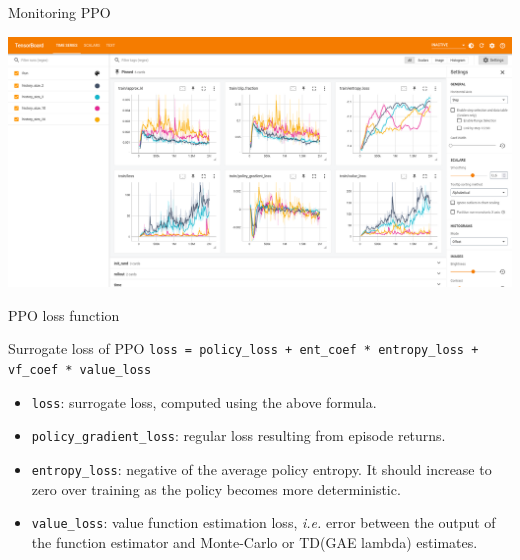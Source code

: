 \documentclass[10pt, aspectratio=1610]{beamer}
\begin{document}
\begin{frame}{Monitoring PPO}
   \begin{adjustbox}{width=\paperwidth, height=\paperheight, keepaspectratio, center}
        \includegraphics[width=\columnwidth]{figures/tensorboard-ppo.png}
   \end{adjustbox}
\end{frame}

\begin{frame}[fragile]{PPO loss function}
    \begin{block}{Surrogate loss of PPO}
        \texttt{loss = policy_loss + ent_coef * entropy_loss + vf_coef * value_loss}
    \end{block}
    \begin{itemize}
        \item \texttt{loss}: surrogate loss, computed using the above formula.
        \item \texttt{policy_gradient_loss}: regular loss resulting from episode returns.
        \item \texttt{entropy_loss}: negative of the average policy entropy. It should increase to zero over training as the policy becomes more deterministic.
        \item \texttt{value_loss}: value function estimation loss, \emph{i.e.} error between the output of the function estimator and Monte-Carlo or TD(GAE lambda) estimates.
    \end{itemize}
\end{frame}
\end{document}
